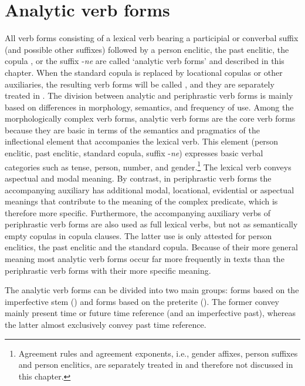 \chapter{Analytic verb forms}
\label{cpt:Analytic verb forms}

All verb forms consisting of a lexical verb bearing a participial or converbal suffix (and possible other suffixes) followed by a person enclitic, the past enclitic, the copula , or the suffix -\textit{ne} are called `analytic verb forms' and described in this chapter. When the standard copula is replaced by locational copulas or other auxiliaries, the resulting verb forms will be called , and they are separately treated in . The division between analytic and periphrastic verb forms is mainly based on differences in morphology, semantics, and frequency of use. Among the morphologically complex verb forms, analytic verb forms are the core verb forms because they are basic in terms of the semantics and pragmatics of the inflectional element that accompanies the lexical verb. This element (person enclitic, past enclitic, standard copula, suffix -\textit{ne}) expresses basic verbal categories such as tense, person, number, and gender.\footnote{Agreement rules and agreement exponents, i.e., gender affixes, person suffixes and person enclitics, are separately treated in  and therefore not discussed in this chapter.} The lexical verb conveys aspectual and modal meaning. By contrast, in periphrastic verb forms the accompanying auxiliary has additional modal, locational, evidential or aspectual meanings that contribute to the meaning of the complex predicate, which is therefore more specific. Furthermore, the accompanying auxiliary verbs of periphrastic verb forms are also used as full lexical verbs, but not as semantically empty copulas in copula clauses. The latter use is only attested for person enclitics, the past enclitic and the standard copula. Because of their more general meaning most analytic verb forms occur far more frequently in texts than the periphrastic verb forms with their more specific meaning.     

The analytic verb forms can be divided into two main groups: forms based on the imperfective stem () and forms based on the preterite (). The former convey mainly present time or future time reference (and an imperfective past), whereas the latter almost exclusively convey past time reference.


